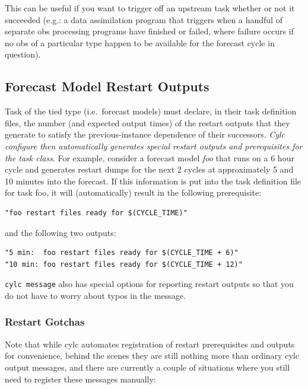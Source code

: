 \documentclass[11pt,a4paper]{article}
\begin{document}
This can be useful if you want to trigger off an upstream task whether
or not it succeeded (e.g.: a data assimilation program that triggers
when a handful of separate obs processing programs have finished or
failed, where failure occurs if no obs of a particular type happen to be
available for the forecast cycle in question).


\subsection{Forecast Model Restart Outputs}

Task of the tied type (i.e.\ forecast models) must declare, in their
task definition files, the number (and expected output times) of
the restart outputs that they generate to satisfy the previous-instance
dependence of their successors. {\em Cylc configure then automatically
generates special restart outputs and prerequisites for the task class}.
For example, consider a forecast model {\em foo} that runs on a
6 hour cycle and generates restart dumps for the next 2 cycles at
approximately 5 and 10 minutes into the forecast. If this information 
is put into the task definition file for task foo, it will
(automatically) result in the following prerequisite:

\begin{lstlisting}
"foo restart files ready for $(CYCLE_TIME)"
\end{lstlisting}

and the following two outputs:

\begin{lstlisting}
"5 min:  foo restart files ready for $(CYCLE_TIME + 6)"
"10 min: foo restart files ready for $(CYCLE_TIME + 12)"
\end{lstlisting}

\lstinline=cylc message= also has special options for reporting restart
outputs so that you do not have to worry about typos in the message. 

\subsubsection{Restart Gotchas}

Note that while cylc automates registration of restart prerequisites and 
outputs for convenience, behind the scenes they are still nothing more
than ordinary cylc output messages, and there are currently a couple
of situations where you still need to register these messages manually:
\end{document}
